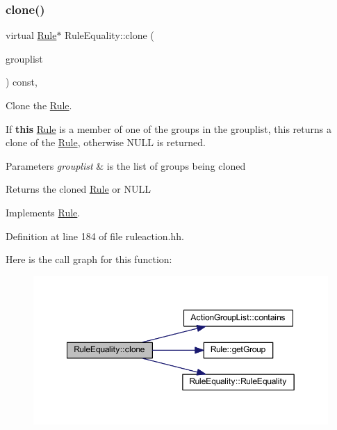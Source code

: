 \subsubsection{\texorpdfstring{clone()}{clone()}}
{\footnotesize\ttfamily virtual \mbox{\hyperlink{class_rule}{Rule}}$\ast$ Rule\+Equality\+::clone (\begin{DoxyParamCaption}\item[{const \mbox{\hyperlink{class_action_group_list}{Action\+Group\+List}} \&}]{grouplist }\end{DoxyParamCaption}) const\hspace{0.3cm}{\ttfamily [inline]}, {\ttfamily [virtual]}}



Clone the \mbox{\hyperlink{class_rule}{Rule}}. 

If {\bfseries{this}} \mbox{\hyperlink{class_rule}{Rule}} is a member of one of the groups in the grouplist, this returns a clone of the \mbox{\hyperlink{class_rule}{Rule}}, otherwise N\+U\+LL is returned. 
\begin{DoxyParams}{Parameters}
{\em grouplist} & is the list of groups being cloned \\
\hline
\end{DoxyParams}
\begin{DoxyReturn}{Returns}
the cloned \mbox{\hyperlink{class_rule}{Rule}} or N\+U\+LL 
\end{DoxyReturn}


Implements \mbox{\hyperlink{class_rule_a70de90a76461bfa7ea0b575ce3c11e4d}{Rule}}.



Definition at line 184 of file ruleaction.\+hh.

Here is the call graph for this function\+:
\nopagebreak
\begin{figure}[H]
\begin{center}
\leavevmode
\includegraphics[width=349pt]{class_rule_equality_a78a0d12ca064653dd2ed59dee9d01cd3_cgraph}
\end{center}
\end{figure}
\mbox{\label{class_rule_equality_a06e285491252338eab8722052a845e8c}} 
